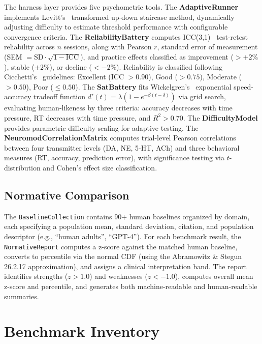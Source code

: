 \documentclass[11pt,letterpaper]{article}
\begin{document}
The harness layer provides five psychometric tools. The \textbf{AdaptiveRunner} implements Levitt's~\citep{levitt1971transformed} transformed up-down staircase method, dynamically adjusting difficulty to estimate threshold performance with configurable convergence criteria. The \textbf{ReliabilityBattery} computes ICC(3,1)~\citep{shrout1979intraclass} test-retest reliability across $n$ sessions, along with Pearson $r$, standard error of measurement (SEM $= \text{SD} \cdot \sqrt{1 - \text{ICC}}$), and practice effects classified as improvement ($> +2\%$), stable ($\pm 2\%$), or decline ($< -2\%$). Reliability is classified following Cicchetti's~\citep{cicchetti1994guidelines} guidelines: Excellent (ICC $> 0.90$), Good ($> 0.75$), Moderate ($> 0.50$), Poor ($\leq 0.50$). The \textbf{SatBattery} fits Wickelgren's~\citep{wickelgren1977speed} exponential speed-accuracy tradeoff function $d'(t) = \lambda(1 - e^{-\beta(t - \delta)})$ via grid search, evaluating human-likeness by three criteria: accuracy decreases with time pressure, RT decreases with time pressure, and $R^2 > 0.70$. The \textbf{DifficultyModel} provides parametric difficulty scaling for adaptive testing. The \textbf{NeuromodCorrelationMatrix} computes trial-level Pearson correlations between four transmitter levels (DA, NE, 5-HT, ACh) and three behavioral measures (RT, accuracy, prediction error), with significance testing via $t$-distribution and Cohen's effect size classification.

\subsection{Normative Comparison}

The \texttt{BaselineCollection} contains 90+ human baselines organized by domain, each specifying a population mean, standard deviation, citation, and population descriptor (e.g., ``human adults'', ``GPT-4''). For each benchmark result, the \texttt{NormativeReport} computes a z-score against the matched human baseline, converts to percentile via the normal CDF (using the Abramowitz \& Stegun 26.2.17 approximation), and assigns a clinical interpretation band. The report identifies strengths ($z > 1.0$) and weaknesses ($z < -1.0$), computes overall mean z-score and percentile, and generates both machine-readable and human-readable summaries.

\section{Benchmark Inventory}
\label{sec:inventory}
\end{document}
